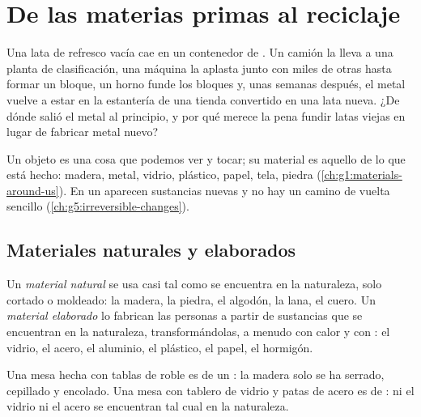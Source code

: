 \chapter{De las materias primas al reciclaje}\label{ch:g5:raw-materials-and-recycling}

Una lata de refresco vacía cae en un contenedor de . Un camión
la lleva a una planta de clasificación, una máquina la aplasta junto con
miles de otras hasta formar un bloque, un horno funde los bloques y,
unas semanas después, el metal vuelve a estar en la estantería de una
tienda convertido en una lata nueva. ¿De dónde salió el metal al
principio, y por qué merece la pena fundir latas viejas en lugar de
fabricar metal nuevo?

\begin{recall}
Un objeto es una cosa que podemos ver y tocar; su material es aquello de
lo que está hecho: madera, metal, vidrio, plástico, papel, tela, piedra
(\cref{ch:g1:materials-around-us}). En un  aparecen
sustancias nuevas y no hay un camino de vuelta sencillo (\cref{ch:g5:irreversible-changes}).
\end{recall}

\section{Materiales naturales y elaborados}

\begin{definition}\label{def:g5:raw-materials-and-recycling:natural-material}
Un \emph{material natural} se usa casi tal como
se encuentra en la naturaleza, solo cortado o moldeado: la madera, la
piedra, el algodón, la lana, el cuero.
Un \emph{material elaborado} lo fabrican
las personas a partir de sustancias que se encuentran en la naturaleza,
transformándolas, a menudo con calor y con : el vidrio,
el acero, el aluminio, el plástico, el papel, el hormigón.
\end{definition}

\begin{example}\label{ex:g5:raw-materials-and-recycling:tables}
Una mesa hecha con tablas de roble es de un : la madera
solo se ha serrado, cepillado y encolado. Una mesa con tablero de vidrio
y patas de acero es de : ni el vidrio ni el acero
se encuentran tal cual en la naturaleza.
\end{example}

